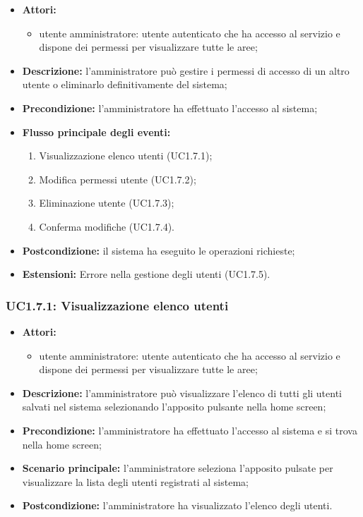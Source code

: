 \begin{itemize}
	\item \textbf{Attori:}
	\begin{itemize}
		\item utente amministratore: utente autenticato che ha accesso al servizio e dispone dei permessi per visualizzare tutte le aree;
	\end{itemize}
	\item \textbf{Descrizione:} l'amministratore può gestire i permessi di accesso di un altro utente o eliminarlo definitivamente del sistema;
	\item \textbf{Precondizione:} l'amministratore ha effettuato l'accesso al sistema;
	\item \textbf{Flusso principale degli eventi:}
	\begin{enumerate}
		\item Visualizzazione elenco utenti (UC1.7.1);
		\item Modifica permessi utente (UC1.7.2);
		\item Eliminazione utente (UC1.7.3);
		\item Conferma modifiche (UC1.7.4).
	\end{enumerate}
	\item \textbf{Postcondizione:} il sistema ha eseguito le operazioni richieste;
	\item \textbf{Estensioni:} Errore nella gestione degli utenti (UC1.7.5).
\end{itemize}

\subsubsection{UC1.7.1: Visualizzazione elenco utenti}
\begin{itemize}
	\item \textbf{Attori:}
	\begin{itemize}
		\item utente amministratore: utente autenticato che ha accesso al servizio e dispone dei permessi per visualizzare tutte le aree;
	\end{itemize}
	\item \textbf{Descrizione:} l'amministratore può visualizzare l'elenco di tutti gli utenti salvati nel sistema selezionando l'apposito pulsante nella home screen;
	\item \textbf{Precondizione:} l'amministratore ha effettuato l'accesso al sistema e si trova nella home screen;
	\item \textbf{Scenario principale:} l'amministratore seleziona l'apposito pulsate per visualizzare la lista degli utenti registrati al sistema;
	\item \textbf{Postcondizione:} l'amministratore ha visualizzato l'elenco degli utenti.
\end{itemize}

